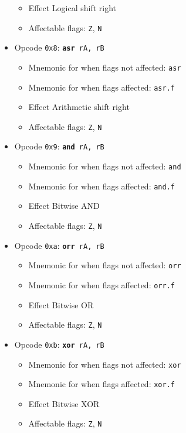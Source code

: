 \documentclass{article}
\begin{document}
\begin{itemize}
\begin{itemize}
		\item Effect Logical shift right
		\item Affectable flags:
			\texttt{Z}, \texttt{N}
		\end{itemize}
	\item Opcode \texttt{0x8}:
		\texttt{\textbf{asr} rA, rB}
		\begin{itemize}
		\item Mnemonic for when flags not affected: \texttt{asr}
		\item Mnemonic for when flags affected: \texttt{asr.f}
		\item Effect Arithmetic shift right
		\item Affectable flags:
			\texttt{Z}, \texttt{N}
		\end{itemize}
	\item Opcode \texttt{0x9}:
		\texttt{\textbf{and} rA, rB}
		\begin{itemize}
		\item Mnemonic for when flags not affected: \texttt{and}
		\item Mnemonic for when flags affected: \texttt{and.f}
		\item Effect Bitwise AND
		\item Affectable flags:
			\texttt{Z}, \texttt{N}
		\end{itemize}
	\item Opcode \texttt{0xa}:
		\texttt{\textbf{orr} rA, rB}
		\begin{itemize}
		\item Mnemonic for when flags not affected: \texttt{orr}
		\item Mnemonic for when flags affected: \texttt{orr.f}
		\item Effect Bitwise OR
		\item Affectable flags:
			\texttt{Z}, \texttt{N}
		\end{itemize}
	\item Opcode \texttt{0xb}:
		\texttt{\textbf{xor} rA, rB}
		\begin{itemize}
		\item Mnemonic for when flags not affected: \texttt{xor}
		\item Mnemonic for when flags affected: \texttt{xor.f}
		\item Effect Bitwise XOR
		\item Affectable flags:
			\texttt{Z}, \texttt{N}
		\end{itemize}

\end{itemize}
\end{document}
